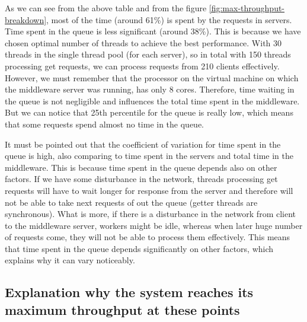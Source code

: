 \documentclass[11pt]{article}
\begin{document}
As we can see from the above table and from the figure \ref{fig:max-throughput-breakdown}, most of the time (around 61\%) is spent by the requests in servers. Time spent in the queue is less significant (around 38\%). This is because we have chosen optimal number of threads to achieve the best performance. With 30 threads in the single thread pool (for each server), so in total with 150 threads processing get requests, we can process requests from 210 clients effectively. However, we must remember that the processor on the virtual machine on which the middleware server was running, has only 8 cores. Therefore, time waiting in the queue is not negligible and influences the total time spent in the middleware. But we can notice that 25th percentile for the queue is really low, which means that some requests spend almost no time in the queue.

It must be pointed out that the coefficient of variation for time spent in the queue is high, also comparing to time spent in the servers and total time in the middleware. This is because time spent in the queue depends also on other factors. If we have some disturbance in the network, threads processing get requests will have to wait longer for response from the server and therefore will not be able to take next requests of out the queue (getter threads are synchronous). What is more, if there is a disturbance in the network from client to the middleware server, workers might be idle, whereas when later huge number of requests come, they will not be able to process them effectively. This means that time spent in the queue depends significantly on other factors, which explains why it can vary noticeably.

\subsection{Explanation why the system reaches its maximum throughput at these points}
\label{sec:max-throughput-explanation}
\end{document}
